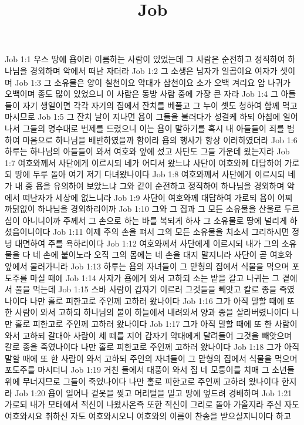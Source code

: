 

\title{Job}

Job 1:1  우스 땅에 욥이라 이름하는 사람이 있었는데 그 사람은 순전하고 정직하여 하나님을 경외하며 악에서 떠난 자더라
Job 1:2  그 소생은 남자가 일곱이요 여자가 셋이며
Job 1:3  그 소유물은 양이 칠천이요 약대가 삼천이요 소가 오백 겨리요 암 나귀가 오백이며 종도 많이 있었으니 이 사람은 동방 사람 중에 가장 큰 자라
Job 1:4  그 아들들이 자기 생일이면 각각 자기의 집에서 잔치를 베풀고 그 누이 셋도 청하여 함께 먹고 마시므로
Job 1:5  그 잔치 날이 지나면 욥이 그들을 불러다가 성결케 하되 아침에 일어나서 그들의 명수대로 번제를 드렸으니 이는 욥이 말하기를 혹시 내 아들들이 죄를 범하여 마음으로 하나님을 배반하였을까 함이라 욥의 행사가 항상 이러하였더라
Job 1:6  하루는 하나님의 아들들이 와서 여호와 앞에 섰고 사단도 그들 가운데 왔는지라
Job 1:7  여호와께서 사단에게 이르시되 네가 어디서 왔느냐 사단이 여호와께 대답하여 가로되 땅에 두루 돌아 여기 저기 다녀왔나이다
Job 1:8  여호와께서 사단에게 이르시되 네가 내 종 욥을 유의하여 보았느냐 그와 같이 순전하고 정직하여 하나님을 경외하며 악에서 떠난자가 세상에 없느니라
Job 1:9  사단이 여호와께 대답하여 가로되 욥이 어찌 까닭없이 하나님을 경외하리이까
Job 1:10  그와 그 집과 그 모든 소유물을 산울로 두르심이 아니니이까 주께서 그 손으로 하는 바를 복되게 하사 그 소유물로 땅에 널리게 하셨음이니이다
Job 1:11  이제 주의 손을 펴서 그의 모든 소유물을 치소서 그리하시면 정녕 대면하여 주를 욕하리이다
Job 1:12  여호와께서 사단에게 이르시되 내가 그의 소유물을 다 네 손에 붙이노라 오직 그의 몸에는 네 손을 대지 말지니라 사단이 곧 여호와 앞에서 물러가니라
Job 1:13  하루는 욥의 자녀들이 그 맏형의 집에서 식물을 먹으며 포도주를 마실 때에
Job 1:14  사자가 욥에게 와서 고하되 소는 밭을 갈고 나귀는 그 곁에서 풀을 먹는데
Job 1:15  스바 사람이 갑자기 이르러 그것들을 빼앗고 칼로 종을 죽였나이다 나만 홀로 피한고로 주인께 고하러 왔나이다
Job 1:16  그가 아직 말할 때에 또 한 사람이 와서 고하되 하나님의 불이 하늘에서 내려와서 양과 종을 살라버렸나이다 나만 홀로 피한고로 주인께 고하러 왔나이다
Job 1:17  그가 아직 말할 때에 또 한 사람이 와서 고하되 갈대아 사람이 세 떼를 지어 갑자기 약대에게 달려들어 그것을 빼앗으며 칼로 종을 죽였나이다 나만 홀로 피한고로 주인께 고하러 왔나이다
Job 1:18  그가 아직 말할 때에 또 한 사람이 와서 고하되 주인의 자녀들이 그 맏형의 집에서 식물을 먹으며 포도주를 마시더니
Job 1:19  거친 들에서 대풍이 와서 집 네 모퉁이를 치매 그 소년들 위에 무너지므로 그들이 죽었나이다 나만 홀로 피한고로 주인께 고하러 왔나이다 한지라
Job 1:20  욥이 일어나 겉옷을 찢고 머리털을 밀고 땅에 엎드려 경배하며
Job 1:21  가로되 내가 모태에서 적신이 나왔사온즉 또한 적신이 그리로 돌아 가올지라 주신 자도 여호와시요 취하신 자도 여호와시오니 여호와의 이름이 찬송을 받으실지니이다 하고
